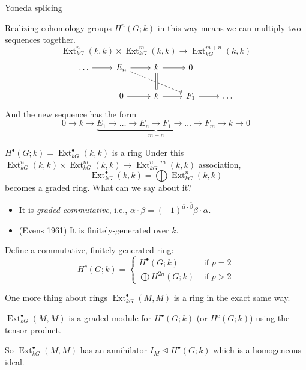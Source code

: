 \documentclass{beamer}
\theoremstyle{definition}
\newcommand{\Ext}{\operatorname{Ext}}
\begin{document}
\begin{frame}{Yoneda splicing}\pause

  Realizing cohomology groups $H^n(G;k)$ in this way means we can multiply two sequences together.
  \[
    \Ext^n_{kG}(k,k) \times \Ext^m_{kG}(k,k) \to \Ext^{m+n}_{kG}(k,k)
  \]\pause
  \[
    \begin{tikzcd}[ampersand replacement=\&]
      \ldots \arrow[r] \& E_n \arrow[r] \arrow[drr,dashed] \& k \arrow[d,equals]\arrow[r] \& 0  \\
      \& 0 \arrow[r] \& k \arrow[r] \&  F_1 \arrow[r] \& \ldots 
    \end{tikzcd}
  \]\pause
  And the new sequence has the form
  \[
    0 \to k \to \underbrace{E_1 \to \ldots \to E_n \to F_1 \to \ldots \to F_m}_{m+n} \to k \to 0
  \]
  
\end{frame}

\begin{frame}{$H^\bullet(G;k) = \Ext^\bullet_{kG}(k,k)$ is a ring}\pause
  Under this $\Ext^n_{kG}(k,k) \times \Ext^m_{kG}(k,k) \to \Ext^{n+m}_{kG}(k,k)$ association, \[
    \Ext^\bullet_{kG}(k,k) = \bigoplus \Ext^n_{kG}(k,k)
  \]
  becomes a graded ring. \pause What can we say about it? \pause
  \begin{itemize}
  \item It is \emph{graded-commutative}, i.e., $\alpha \cdot \beta = (-1)^{\bar \alpha \cdot \bar \beta} \beta \cdot \alpha$.\pause
  \item (Evens 1961) It is finitely-generated over $k$.\pause
  \end{itemize}
  Define a commutative, finitely generated ring:
  \[
    H^c(G;k) = \begin{cases}
      H^\bullet(G;k) &\text{ if } p = 2 \\
      \bigoplus H^{2n}(G;k) &\text{ if } p > 2
      \end{cases}
   \] 
  
 \end{frame}

  \begin{frame}{One more thing about rings}\pause
   $\Ext^\bullet_{kG}(M,M)$ is a ring in the exact same way.\pause

   \vspace{0.2in}
   $\Ext^\bullet_{kG}(M,M)$ is a graded module for $H^\bullet(G;k)$ (or $H^c(G;k)$) using the tensor product.\pause

   \vspace{0.2in}
   So $\Ext^\bullet_{kG}(M,M)$ has an annihilator $I_M \trianglelefteq H^\bullet(G;k)$ which is a homogeneous ideal.
 \end{frame}
\end{document}
